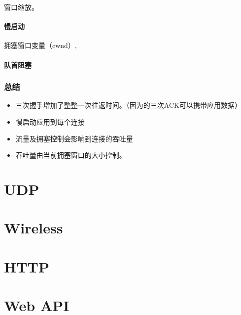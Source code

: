窗口缩放。

\paragraph{慢启动}

拥塞窗口变量（cwnd）,

\paragraph{队首阻塞}


\subsubsection{总结}

\begin{itemize}
\item 三次握手增加了整整一次往返时间。（因为的三次ACK可以携带应用数据）
\item 慢启动应用到每个连接
\item 流量及拥塞控制会影响到连接的吞吐量
\item 吞吐量由当前拥塞窗口的大小控制。
\end{itemize}

\section{UDP}

\section{Wireless}

\section{HTTP}

\section{Web API}